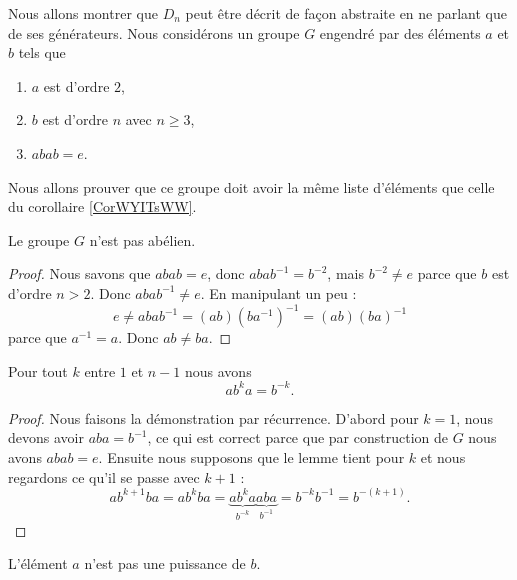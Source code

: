 Nous allons montrer que \( D_n\) peut être décrit de façon abstraite en ne parlant que de ses générateurs. Nous considérons un groupe \( G\) engendré par des éléments \( a\) et \( b\) tels que
\begin{enumerate}
    \item
        \( a\) est d'ordre \( 2\),
    \item
        \( b\) est d'ordre \( n\) avec \( n\geq 3\),
    \item
        \( abab=e\).
\end{enumerate}
Nous allons prouver que ce groupe doit avoir la même liste d'éléments que celle du corollaire \ref{CorWYITsWW}.

\begin{proposition}
    Le groupe \( G\) n'est pas abélien.
\end{proposition}

\begin{proof}
    Nous savons que \( abab=e\), donc \( abab^{-1}=b^{-2}\), mais \( b^{-2}\neq e\) parce que \( b\) est d'ordre \( n>2\). Donc \( abab^{-1}\neq e\). En manipulant un peu :
    \begin{equation}
        e\neq abab^{-1}=(ab)(ba^{-1})^{-1}=(ab)(ba)^{-1}
    \end{equation}
    parce que \( a^{-1}=a\). Donc \( ab\neq ba\).
\end{proof}

\begin{lemma}        \label{LemKKXdqdL}
    Pour tout \( k\) entre \( 1\) et \( n-1\) nous avons
    \begin{equation}
        ab^ka=b^{-k}.
    \end{equation}
\end{lemma}

\begin{proof}
    Nous faisons la démonstration par récurrence. D'abord pour \( k=1\), nous devons avoir \( aba=b^{-1}\), ce qui est correct parce que par construction de \( G\) nous avons \( abab=e\). Ensuite nous supposons que le lemme tient pour \( k\) et nous regardons ce qu'il se passe avec \( k+1\) :
    \begin{equation}
            ab^{k+1}ba=ab^kba=\underbrace{ab^ka}_{b^{-k}}\underbrace{aba}_{b^{-1}}=b^{-k}b^{-1}=b^{-(k+1)}.
    \end{equation}
\end{proof}

\begin{proposition}
    L'élément \( a\) n'est pas une puissance de \( b\).
\end{proposition}

